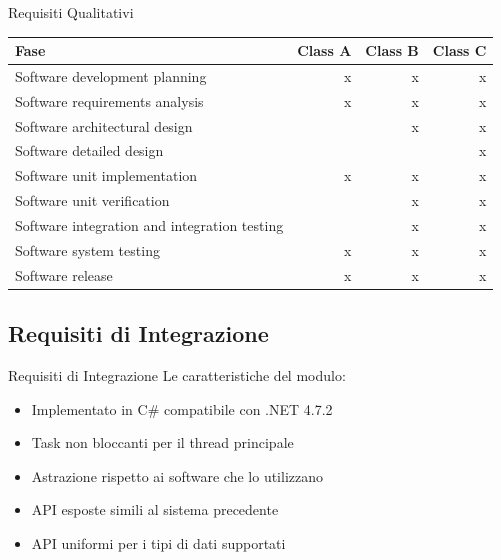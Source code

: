\documentclass{beamer}
\begin{document}
\begin{darkframes}
\begin{frame}{Requisiti Qualitativi}
      \begin{table}[!b]
        {\carlitoTLF %
        \begin{tabularx}{\textwidth}{Xrrr}
          \textbf{Fase} & \textbf{Class A} & \textbf{Class B} & \textbf{Class C} \\
          \toprule
          Software development planning                 & x & x & x \\
          Software requirements analysis                & x & x & x \\
          Software architectural design                 &   & x & x \\
          Software detailed design                      &   &   & x \\
          Software unit implementation                  & x & x & x \\
          Software unit verification                    &   & x & x \\
          Software integration and integration testing  &   & x & x \\
          Software system testing                       & x & x & x \\
          Software release                              & x & x & x \\
          \bottomrule
        \end{tabularx}}
      \end{table}

    \end{frame}

    \subsection{Requisiti di Integrazione}
    \begin{frame}{Requisiti di Integrazione}
      Le caratteristiche del modulo:
      \begin{itemize}
        \item Implementato in C\# compatibile con .NET 4.7.2
        \item Task non bloccanti per il thread principale
        \item Astrazione rispetto ai software che lo utilizzano
        \item API esposte simili al sistema precedente
        \item API uniformi per i tipi di dati supportati
      \end{itemize}
    \end{frame}


\end{darkframes}
\end{document}
